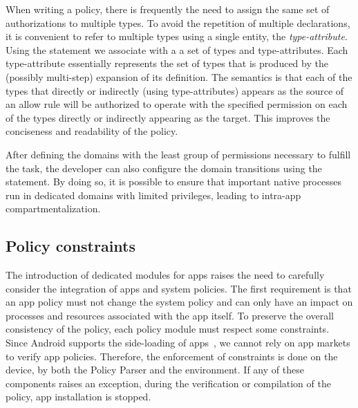 When writing a policy, there is frequently the need to assign the same
set of authorizations to multiple types.  To avoid the repetition of
multiple \allow declarations, it is convenient to refer to multiple
types using a single entity, the {\em type-attribute}.  Using the
\typeattributeset statement we associate with a \typeattribute a set
of types and type-attributes.  Each type-attribute essentially
represents the set of types that is produced by the (possibly
multi-step) expansion of its definition.  The semantics is that each
of the types that directly or indirectly (using type-attributes)
appears as the source of an allow rule will be authorized to operate
with the specified permission on each of the types directly or
indirectly appearing as the target.  This improves the conciseness and
readability of the policy.

After defining the domains with the least group of permissions
necessary to fulfill the task, the developer can also configure the
domain transitions using the \typetransition statement.
By doing so, it is possible to ensure that important native processes run
in dedicated domains with limited privileges, leading to intra-app
compartmentalization.


\subsection{Policy constraints}\label{subsect:seapp_constraints}

The introduction of dedicated modules for apps raises the need to
carefully consider the integration of apps and system policies.  The
first requirement is that an app policy must not change the system
policy and can only have an impact on processes and resources
associated with the app itself.  To preserve the overall consistency
of the \sel policy, each policy module must respect some constraints.
Since Android supports the side-loading of
apps~\cite{seapp_adb_install}, we cannot rely on app markets to verify
app policies.  Therefore, the enforcement of constraints is done on
the device, by both the \seapp Policy Parser and the \sel environment.
If any of these components raises an exception, during the
verification or compilation of the policy, app installation is
stopped.

